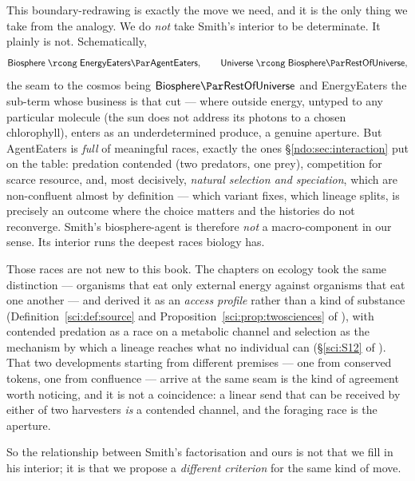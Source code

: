 This boundary-redrawing is exactly the move we need, and it is the only thing we take
from the analogy. We do \emph{not} take Smith's interior to be determinate. It plainly
is not. Schematically,
\[
\textsf{Biosphere} \;\rcong\; \textsf{EnergyEaters} \Par \textsf{AgentEaters},
\qquad
\textsf{Universe} \;\rcong\; \textsf{Biosphere} \Par \textsf{RestOfUniverse},
\]
the seam to the cosmos being $\textsf{Biosphere} \Par \textsf{RestOfUniverse}$ and
\textsf{EnergyEaters} the sub-term whose business is that cut --- where outside energy,
untyped to any particular molecule (the sun does not address its photons to a chosen
chlorophyll), enters as an underdetermined produce, a genuine aperture. But
\textsf{AgentEaters} is \emph{full} of meaningful races, exactly the ones
\S\ref{ndo:sec:interaction} put on the table: predation contended (two predators, one
prey), competition for scarce resource, and, most decisively, \emph{natural selection
and speciation}, which are non-confluent almost by definition --- which variant fixes,
which lineage splits, is precisely an outcome where the choice matters and the
histories do not reconverge. Smith's biosphere-agent is therefore \emph{not} a
macro-component in our sense. Its interior runs the deepest races biology has.

Those races are not new to this book. The chapters on ecology took the same
distinction --- organisms that eat only external energy against organisms that eat one
another --- and derived it as an \emph{access profile} rather than a kind of substance
(Definition~\ref{sci:def:source} and Proposition~\ref{sci:prop:twosciences} of
\chSci), with contended predation as a race on a metabolic channel and selection as
the mechanism by which a lineage reaches what no individual can
(\S\ref{sci:S12} of \chSci). That two developments starting from different premises
--- one from conserved tokens, one from confluence --- arrive at the same seam is the
kind of agreement worth noticing, and it is not a coincidence: a linear send that can
be received by either of two harvesters \emph{is} a contended channel, and the
foraging race is the aperture.

So the relationship between Smith's factorisation and ours is not that we fill in his
interior; it is that we propose a \emph{different criterion} for the same kind of move.

